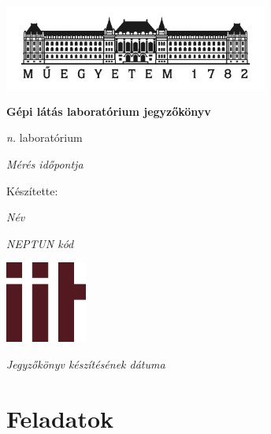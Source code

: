 \documentclass[paper=letter, fontsize=12pt]{article}
\begin{document}
	

\begin{titlepage}
	\begin{center}
		\vspace*{0.1cm}
		
		\includegraphics[width=0.65\textwidth]{mue}
		
		\vspace*{0.4cm}
		
		\huge
		\textbf{Gépi látás laboratórium jegyzőkönyv}
		
		\vspace*{2cm}		
		
		\LARGE
		\textit{n.} laboratórium

		\vspace*{0.2cm}
		\textit{Mérés időpontja}
		
		\vspace*{2cm}
		Készítette:
		
		\vspace*{0.4cm}
		\textit{Név}
		
		\vspace*{0.4cm}
		\textit{NEPTUN kód}
		
		\vspace*{2.3cm}
		
		\includegraphics[width=0.2\textwidth]{iit}
		
		\vspace*{1.5cm}		
	\end{center}
\Large
\hfill \textit{Jegyzőkönyv készítésének dátuma}

\end{titlepage}


\tableofcontents
\newpage

\section{Feladatok}
\end{document}
